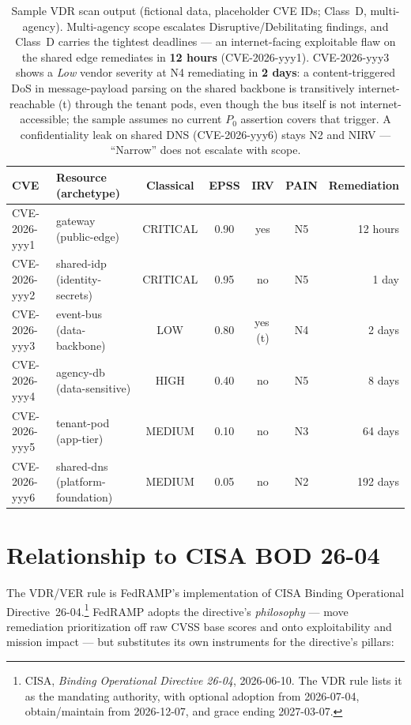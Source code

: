 \documentclass[11pt]{article}
\newcommand{\tagn}[1]{{\footnotesize\ttfamily #1}}
\begin{document}
\begin{table}[H]
\centering
\renewcommand{\arraystretch}{1.3}
\setlength{\tabcolsep}{4pt}
\footnotesize
\begin{tabular}{l l c c c c r}
\toprule
\textbf{CVE} & \textbf{Resource (archetype)} & \textbf{Classical} & \textbf{EPSS} & \textbf{IRV} & \textbf{PAIN} & \textbf{Remediation} \\
\midrule
CVE-2026-yyy1 & gateway \tagn{(public-edge)}         & \cellcolor{crit!25}CRITICAL & 0.90 & yes & \cellcolor{crit!30}N5 & 12 hours \\
CVE-2026-yyy2 & shared-idp \tagn{(identity-secrets)} & \cellcolor{crit!25}CRITICAL & 0.95 & no  & \cellcolor{crit!30}N5 & 1 day \\
CVE-2026-yyy3 & event-bus \tagn{(data-backbone)}     & \cellcolor{low!30}LOW       & 0.80 & yes\,(t) & \cellcolor{high!35}N4 & 2 days \\
CVE-2026-yyy4 & agency-db \tagn{(data-sensitive)}    & \cellcolor{high!25}HIGH     & 0.40 & no  & \cellcolor{crit!30}N5 & 8 days \\
CVE-2026-yyy5 & tenant-pod \tagn{(app-tier)}         & \cellcolor{med!35}MEDIUM    & 0.10 & no  & \cellcolor{med!35}N3 & 64 days \\
CVE-2026-yyy6 & shared-dns \tagn{(platform-foundation)} & \cellcolor{med!35}MEDIUM & 0.05 & no  & \cellcolor{low!30}N2 & 192 days \\
\bottomrule
\end{tabular}
\caption{Sample VDR scan output (fictional data, placeholder CVE IDs; Class~D, multi-agency). Multi-agency
scope escalates Disruptive/Debilitating findings, and Class~D carries the tightest
deadlines --- an internet-facing exploitable flaw on the shared edge remediates in
\textbf{12 hours} (CVE-2026-yyy1). CVE-2026-yyy3 shows a \emph{Low} vendor severity
at N4 remediating in \textbf{2 days}: a content-triggered DoS in
message-payload parsing on the shared backbone is transitively internet-reachable
(t) through the tenant pods, even though the bus itself is not internet-accessible;
the sample assumes no current $P_0$ assertion covers that trigger.
A confidentiality leak on shared DNS (CVE-2026-yyy6) stays N2 and NIRV ---
``Narrow'' does not escalate with scope.}
\label{tab:scand}
\end{table}

\section{Relationship to CISA BOD 26-04}
\label{sec:bod}
The VDR/VER rule is FedRAMP's implementation of CISA Binding Operational
Directive~26-04.\footnote{CISA, \emph{Binding Operational Directive 26-04}, 2026-06-10.
The VDR rule lists it as the mandating authority, with optional adoption from
2026-07-04, obtain/maintain from 2026-12-07, and grace ending 2027-03-07.} FedRAMP
adopts the directive's \emph{philosophy} --- move remediation prioritization off raw
CVSS base scores and onto exploitability and mission impact --- but substitutes its
own instruments for the directive's pillars:
\end{document}
